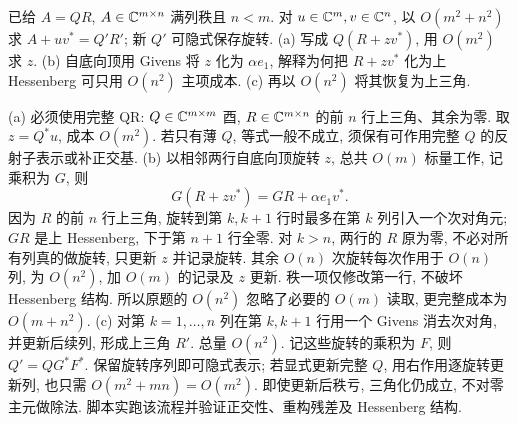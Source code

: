 \begin{exercise}\label{e2013:q3}
已给 $A=QR$, $A\in\mathbb C^{m\times n}$ 满列秩且 $n<m$. 对 $u\in\mathbb C^m,v\in\mathbb C^n$, 以 $O(m^2+n^2)$ 求 $A+uv^*=Q'R'$; 新 $Q'$ 可隐式保存旋转.
(a) 写成 $Q(R+zv^*)$, 用 $O(m^2)$ 求 $z$.
(b) 自底向顶用 Givens 将 $z$ 化为 $\alpha e_1$, 解释为何把 $R+zv^*$ 化为上 Hessenberg 可只用 $O(n^2)$ 主项成本.
(c) 再以 $O(n^2)$ 将其恢复为上三角.
\end{exercise}
\begin{solution}
(a) 必须使用完整 QR: $Q\in\mathbb C^{m\times m}$ 酉, $R\in\mathbb C^{m\times n}$ 的前 $n$ 行上三角、其余为零. 取 $z=Q^*u$, 成本 $O(m^2)$. 若只有薄 $Q$, 等式一般不成立, 须保有可作用完整 $Q$ 的反射子表示或补正交基.
(b) 以相邻两行自底向顶旋转 $z$, 总共 $O(m)$ 标量工作, 记乘积为 $G$, 则
\[
 G(R+zv^*)=GR+\alpha e_1v^*.
\]
因为 $R$ 的前 $n$ 行上三角, 旋转到第 $k,k+1$ 行时最多在第 $k$ 列引入一个次对角元; $GR$ 是上 Hessenberg, 下于第 $n+1$ 行全零. 对 $k>n$, 两行的 $R$ 原为零, 不必对所有列真的做旋转, 只更新 $z$ 并记录旋转. 其余 $O(n)$ 次旋转每次作用于 $O(n)$ 列, 为 $O(n^2)$, 加 $O(m)$ 的记录及 $z$ 更新. 秩一项仅修改第一行, 不破坏 Hessenberg 结构. 所以原题的 $O(n^2)$ 忽略了必要的 $O(m)$ 读取, 更完整成本为 $O(m+n^2)$.
(c) 对第 $k=1,\ldots,n$ 列在第 $k,k+1$ 行用一个 Givens 消去次对角, 并更新后续列, 形成上三角 $R'$. 总量 $O(n^2)$. 记这些旋转的乘积为 $F$, 则 $Q'=QG^*F^*$. 保留旋转序列即可隐式表示; 若显式更新完整 $Q$, 用右作用逐旋转更新列, 也只需 $O(m^2+mn)=O(m^2)$. 即使更新后秩亏, 三角化仍成立, 不对零主元做除法. 脚本实跑该流程并验证正交性、重构残差及 Hessenberg 结构.
\end{solution}
